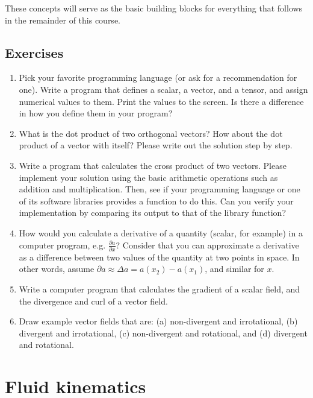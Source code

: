\documentclass[12pt]{article}
\numberwithin{equation}{section}
\numberwithin{figure}{section}
\numberwithin{table}{section}
\begin{document}
These concepts will serve as the basic building blocks for everything that
follows in the remainder of this course.

\subsection*{Exercises}

\begin{enumerate}
  
  \item Pick your favorite programming language (or ask for a recommendation for one).
  Write a program that defines a scalar, a vector, and a tensor, and assign
  numerical values to them.
  Print the values to the screen.
  Is there a difference in how you define them in your program?

  \item What is the dot product of two orthogonal vectors?
  How about the dot product of a vector with itself?
  Please write out the solution step by step.

  \item Write a program that calculates the cross product of two vectors.
  Please implement your solution using the basic arithmetic operations such as
  addition and multiplication.
  Then, see if your programming language or one of its software libraries
  provides a function to do this.
  Can you verify your implementation by comparing its output to that of the
  library function?

  \item How would you calculate a derivative of a quantity
  (scalar, for example) in a computer program, e.g. $\frac{\partial a}{\partial x}$?
  Consider that you can approximate a derivative as a difference between two
  values of the quantity at two points in space.
  In other words, assume $\partial a \approx \Delta a = a(x_2) - a(x_1)$,
  and similar for $x$.

  \item Write a computer program that calculates the gradient of a scalar field,
  and the divergence and curl of a vector field.
  
  \item Draw example vector fields that are: (a) non-divergent and irrotational,
  (b) divergent and irrotational, (c) non-divergent and rotational, and (d)
  divergent and rotational.
\end{enumerate}

\newpage
\section{Fluid kinematics}
\end{document}
